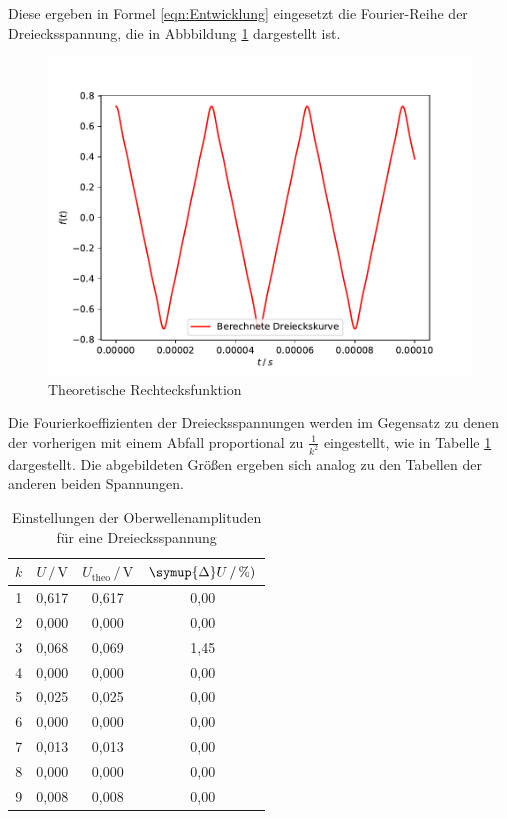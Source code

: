 Diese ergeben in Formel \eqref{eqn:Entwicklung} eingesetzt die Fourier-Reihe
der Dreiecksspannung, die in Abbbildung \ref{fig:Theo3}  dargestellt ist.

\begin{figure}[H]
    \centering
    \includegraphics[scale = 0.6]{content/plot6.pdf}
    \caption{Theoretische Rechtecksfunktion}
    \label{fig:Theo3}
\end{figure}

Die Fourierkoeffizienten der Dreiecksspannungen werden im Gegensatz zu denen
der vorherigen mit einem Abfall proportional zu $\frac{1}{k^2}$ eingestellt,
wie in Tabelle \ref{tab:Messdaten6} dargestellt. Die abgebildeten
Größen ergeben sich analog zu den Tabellen der anderen beiden Spannungen.

\begin{table}[H]
    \centering
    \caption{Einstellungen der Oberwellenamplituden für eine Dreiecksspannung}
    \label{tab:Messdaten6}
    \begin{tabular}{c c c c}
    \toprule
    $k$ & $U \,/\, \si{\volt}$ & $U_\text{theo} \,/\, \si{\volt}$ & $\symup{\Delta}U \,/\, \si{\percent})$ \\
    \midrule
    1 & 0,617 & 0,617 & 0,00 \\
    2 & 0,000 & 0,000 & 0,00 \\
    3 & 0,068 & 0,069 & 1,45 \\
    4 & 0,000 & 0,000 & 0,00 \\
    5 & 0,025 & 0,025 & 0,00 \\
    6 & 0,000 & 0,000 & 0,00 \\
    7 & 0,013 & 0,013 & 0,00 \\
    8 & 0,000 & 0,000 & 0,00 \\
    9 & 0,008 & 0,008 & 0,00 \\
    \bottomrule
    \end{tabular}
\end{table}

